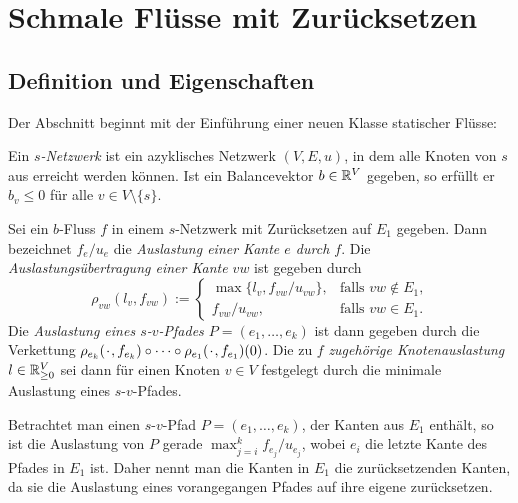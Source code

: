 \chapter{Schmale Flüsse mit Zurücksetzen}\label{chapter-thin-flows}
\newcommand*{\PlH}{\makebox[1ex]{\textbf{$\cdot$}}}

\section{Definition und Eigenschaften}

Der Abschnitt beginnt mit der Einführung einer neuen Klasse statischer Flüsse:

\begin{definition}
	Ein \emph{$s$-Netzwerk} ist ein azyklisches Netzwerk $(V, E, u)$, in dem alle Knoten von $s$ aus erreicht werden können.
	Ist ein Balancevektor $b\in\mathbb{R}^V$ gegeben, so erfüllt er $b_v\leq 0$ für alle $v\in V\setminus \{ s \}$.
	
\end{definition}

\begin{definition}[Auslastung]
	Sei ein $b$-Fluss $f$ in einem $s$-Netzwerk mit Zurücksetzen auf $E_1$ gegeben.
	Dann bezeichnet $f_e/u_e$ die \emph{Auslastung einer Kante $e$ durch $f$}.
	Die \emph{Auslastungsübertragung einer Kante $vw$} ist gegeben durch \[ \rho_{vw}(l_v, f_{vw}) := \begin{cases}
		\max\{ l_v, f_{vw} / u_{vw} \}, & \text{falls $vw\notin E_1$,}\\
		f_{vw} / u_{vw}, & \text{falls $vw\in E_1$.}
	\end{cases}
	\]
	Die \emph{Auslastung eines $s$-$v$-Pfades $P=(e_1,\dots,e_k)$} ist dann gegeben durch die Verkettung $\rho_{e_k}(\PlH, f_{e_k})\circ \dots \circ \rho_{e_1}(\PlH, f_{e_1})(0)$.
	Die zu $f$ \emph{zugehörige Knotenauslastung $l\in\mathbb{R}_{\geq 0}^V$} sei dann für einen Knoten $v\in V$ festgelegt durch die minimale Auslastung eines $s$-$v$-Pfades.
\end{definition}

Betrachtet man einen $s$-$v$-Pfad $P=(e_1, \dots, e_k)$, der Kanten aus $E_1$ enthält, so ist die Auslastung von $P$ gerade $\max_{j=i}^k f_{e_j}/u_{e_j}$, wobei $e_i$ die letzte Kante des Pfades in $E_1$ ist.
Daher nennt man die Kanten in $E_1$ die zurücksetzenden Kanten, da sie die Auslastung eines vorangegangen Pfades auf ihre eigene zurücksetzen.

